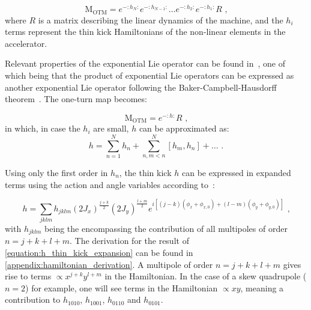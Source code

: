 \begin{equation}
    \mathrm{M_{OTM}} =e^{-:h_N:} e^{-:h_{N-1}:} \ldots e^{-:h_2:} e^{-:h_1:} R \text{ ,}
    \label{equation:one_turn_map_non_linear}
\end{equation}
where \(R\) is a matrix describing the linear dynamics of the machine, and the \(h_i\) terms represent the thin kick Hamiltonians of the non-linear elements in the accelerator.

Relevant properties of the exponential Lie operator can be found in~\cite{PHD:Tomas, PHD:Franchi}, one of which being that the product of exponential Lie operators can be expressed as another exponential Lie operator following the Baker-Campbell-Hausdorff theorem~\cite{BOOK:Hall:Lie_Group_Algebra_Representations}.
The one-turn map becomes:

\begin{equation}
    \mathrm{M_{OTM}} = e^{-:h:} R \text{ ,}
    \label{equation:Campbell_Baker_Hausdorff_theorem}
\end{equation}
in which, in case the \(h_i\) are small, \(h\) can be approximated as:
\begin{equation}
    h = \sum_{n=1}^N h_n + \sum_{n, m<n}^N \left[ h_m, h_n \right] + \ldots \text{ .}
    \label{equation:h_thin_kick_approximation}
\end{equation}

Using only the first order in \(h_n\), the thin kick \(h\) can be expressed in expanded terms using the action and angle variables according to~\cite{PHD:Franchi}:

\begin{equation}
    h = \sum_{jklm} h_{jklm} \left( 2 J_x \right)^{\frac{j+k}{2}} \left( 2 J_y \right)^{\frac{l+m}{2}} e^{i \left[ \left(j-k\right) \left(\phi_x + \phi_{x,0} \right) + \left(l-m\right) \left(\phi_y + \phi_{y,0} \right) \right]} \text{ ,}
    \label{equation:h_thin_kick_expansion}
\end{equation}
with \(h_{jklm}\) being the  encompassing the contribution of all multipoles of order \(n = j + k + l + m\). 
The derivation for the result of \cref{equation:h_thin_kick_expansion} can be found in \cref{appendix:hamiltonian_derivation}.
A multipole of order \(n = j + k + l + m\) gives rise to terms \(\propto x^{j+k} y^{l+m}\) in the Hamiltonian.
In the case of a \gls{skew} quadrupole (\(n=2\)) for example, one will see terms in the Hamiltonian \(\propto xy\), meaning a contribution to \(h_{1010}\), \(h_{1001}\), \(h_{0110}\) and \(h_{0101}\).

